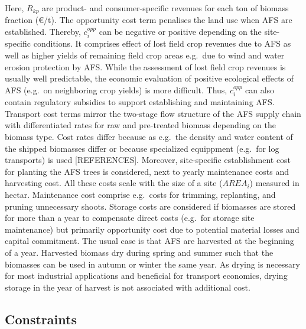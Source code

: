 \documentclass[preprint,review,1p,authoryear]{elsarticle} %
\newcommand{\euro}{€}
\begin{document}
Here, \(R_{kp}\) are product- and consumer-specific revenues for each ton of biomass fraction (\euro{}/t). The opportunity cost term penalises the land use when AFS are established. Thereby, \(c^{{opp}}_i\) can be negative or positive depending on the site-specific conditions. It comprises effect of lost field crop revenues due to AFS as well as higher yields of remaining field crop areas e.g.~due to wind and water erosion protection by AFS. While the assessment of lost field crop revenues is usually well predictable, the economic evaluation of positive ecological effects of AFS (e.g.~on neighboring crop yields) is more difficult. Thus, \(c^{{opp}}_i\) can also contain regulatory subsidies to support establishing and maintaining AFS. Transport cost terms mirror the two-stage flow structure of the AFS supply chain with differentiated rates for raw and pre-treated biomass depending on the biomass type. Cost rates differ because as e.g.~the density and water content of the shipped biomasses differ or because specialized equippment (e.g.~for log transports) is used {[}REFERENCES{]}. Moreover, site-specific establishment cost for planting the AFS trees is considered, next to yearly maintenance costs
and harvesting cost. All these costs scale with the size of a site
(\(AREA_i\)) measured in hectar. Maintenance cost comprise e.g.~costs for
trimming, replanting, and pruning unnecessary shoots. Storage costs are
considered if biomasses are stored for more than a year to compensate
direct costs (e.g.~for storage site maintenance) but primarily
opportunity cost due to potential material losses and capital
commitment. The usual case is that AFS are harvested at the beginning of
a year. Harvested biomass dry during spring and summer such that the
biomasses can be used in autumn or winter the same year. As drying is
necessary for most industrial applications and beneficial for transport
economics, drying storage in the year of harvest is not associated with
additional cost.

\subsection{Constraints}\label{constraints}
\end{document}
